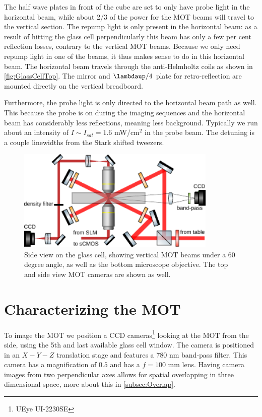 The half wave plates in front of the cube are set to only have probe light in the horizontal beam, while about 2/3 of the power for the MOT beams will travel to the vertical section. 
The repump light is only present in the horizontal beam: as a result of hitting the glass cell perpendicularly this beam has only a few per cent reflection losses, contrary to the vertical MOT beams. 
Because we only need repump light in one of the beams, it thus makes sense to do in this horizontal beam. 
The horizontal beam travels through the anti-Helmholtz coils as shown in \cref{fig:GlassCellTop}.
The mirror and $\lambdaup/4$ plate for retro-reflection are mounted directly on the vertical breadboard. 

Furthermore, the probe light is only directed to the horizontal beam path as well. 
This because the probe is on during the imaging sequences and the horizontal beam has considerably less reflections, meaning less background. 
Typically we run about an intensity of $I \sim I_{sat} =1.6$ mW/cm${}^2$ in the probe beam.
The detuning is a couple linewidths from the Stark shifted tweezers. 

\begin{figure}
    \centering
    \includegraphics[width=0.85\textwidth]{figures/MOTsideview.pdf}
    \caption{Side view on the glass cell, showing vertical MOT beams under a 60 degree angle, as well as the bottom microscope objective. 
    The top and side view MOT cameras are shown as well.}
    \label{fig:GlassCellSide}
\end{figure}


\section{Characterizing the MOT}\label{sec:MOTresult}

To image the MOT we position a CCD cameras\footnote{UEye UI-2230SE} looking at the MOT from the side, using the 5th and last available glass cell window. 
The camera is positioned in an $X-Y-Z$ translation stage and features a 780 nm band-pass filter. 
This camera has a magnification of $0.5$ and has a $f=100$ mm lens. 
Having camera images from two perpendicular axes allows for spatial overlapping in three dimensional space, more about this in \cref{subsec:Overlap}.

